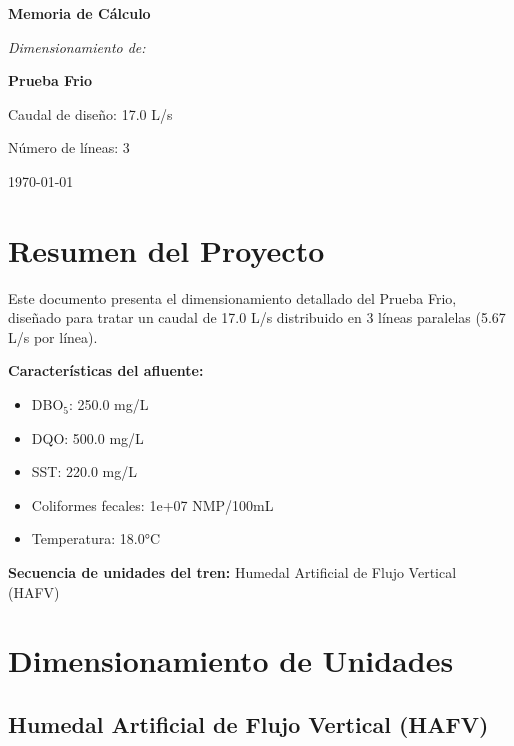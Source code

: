 \documentclass[12pt,a4paper]{article}
\begin{document}
\begin{titlepage}
\centering
\vspace*{2cm}

{\Huge\bfseries Memoria de Cálculo\par}
\vspace{1.5cm}

{\Large\itshape Dimensionamiento de:\par}
\vspace{0.5cm}

{\LARGE\bfseries Prueba Frio\par}
\vspace{2cm}

{\large Caudal de diseño: 17.0 L/s\par}
{\large Número de líneas: 3\par}
\vfill
{\large\today\par}
\end{titlepage}

\tableofcontents

\listoffigures

\listoftables

\newpage
\section{Resumen del Proyecto}

Este documento presenta el dimensionamiento detallado del Prueba Frio, diseñado para tratar un caudal de 17.0 L/s distribuido en 3 líneas paralelas (5.67 L/s por línea).

\textbf{Características del afluente:}
\begin{itemize}
    \item DBO$_5$: 250.0 mg/L
    \item DQO: 500.0 mg/L
    \item SST: 220.0 mg/L
    \item Coliformes fecales: 1e+07 NMP/100mL
    \item Temperatura: 18.0°C
\end{itemize}

\textbf{Secuencia de unidades del tren:} 
Humedal Artificial de Flujo Vertical (HAFV)

\section{Dimensionamiento de Unidades}

\newpage

\subsection{Humedal Artificial de Flujo Vertical (HAFV)}
\end{document}
